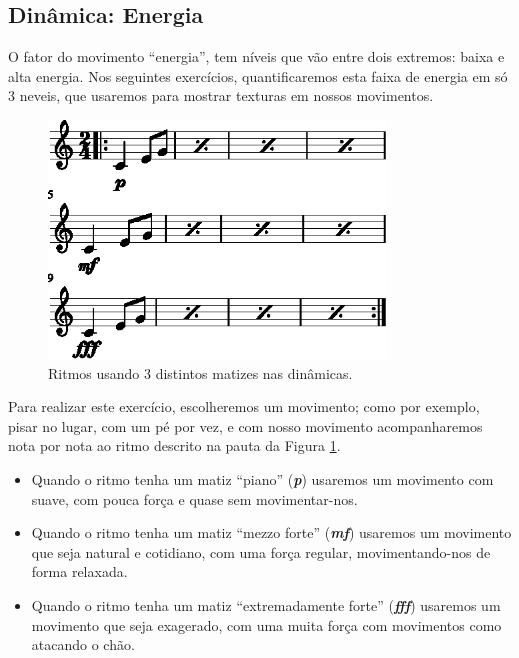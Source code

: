 \subsection{Dinâmica: Energia }
\label{sec:musicalidadenergia}
O fator do movimento ``energia'', 
tem níveis  que vão entre dois extremos: baixa e alta energia.
Nos seguintes exercícios, quantificaremos esta faixa de energia em só 3 neveis,
que usaremos para mostrar texturas em nossos movimentos.

\begin{figure}[!h]
  \centering
    \includegraphics[width=0.8\textwidth]{chapters/cap-musicalidade/dinamica-energia-1.eps}
\caption{Ritmos usando 3 distintos matizes nas dinâmicas.}
\label{fig:dinamica-energia-ex1}
\end{figure}

\begin{example}
Para realizar este exercício, escolheremos um movimento; como por exemplo,
pisar no lugar, com um pé por vez, 
e com nosso movimento  acompanharemos nota por nota 
ao ritmo descrito na pauta da Figura \ref{fig:dinamica-energia-ex1}.
\begin{itemize}
\item Quando o ritmo tenha um matiz ``piano'' (\textbf{\textit{p}}) 
usaremos um movimento com suave,
com pouca força e quase sem movimentar-nos.
\item Quando o ritmo tenha um matiz ``mezzo forte'' (\textbf{\textit{mf}}) 
usaremos um movimento que seja natural e cotidiano,
com uma força regular, movimentando-nos de forma relaxada.
\item Quando o ritmo tenha um matiz ``extremadamente forte''  (\textbf{\textit{fff}}) 
usaremos um movimento que seja exagerado,
com uma muita força com movimentos como atacando o chão.
\end{itemize}
\end{example}

